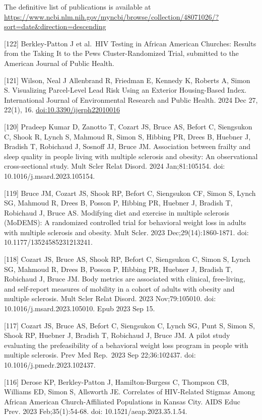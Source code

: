 \documentclass[
  12pt,
]{article}
\begin{document}
The definitive list of publications is available at
\url{https://www.ncbi.nlm.nih.gov/myncbi/browse/collection/48071026/?sort=date&direction=descending}

{[}122{]} Berkley-Patton J et al.~HIV Testing in African American
Churches: Results from the Taking It to the Pews Cluster-Randomized
Trial, submitted to the American Journal of Public Health.

{[}121{]} Wilson, Neal J Allenbrand R, Friedman E, Kennedy K, Roberts A,
Simon S. Visualizing Parcel-Level Lead Risk Using an Exterior
Housing-Based Index. International Journal of Environmental Research and
Public Health. 2024 Dec 27, 22(1), 16. \url{doi:10.3390/ijerph22010016}

{[}120{]} Pradeep Kumar D, Zanotto T, Cozart JS, Bruce AS, Befort C,
Siengsukon C, Shook R, Lynch S, Mahmoud R, Simon S, Hibbing PR, Drees B,
Huebner J, Bradish T, Robichaud J, Sosnoff JJ, Bruce JM. Association
between frailty and sleep quality in people living with multiple
sclerosis and obesity: An observational cross-sectional study. Mult
Scler Relat Disord. 2024 Jan;81:105154. doi:
10.1016/j.msard.2023.105154.

{[}119{]} Bruce JM, Cozart JS, Shook RP, Befort C, Siengsukon CF, Simon
S, Lynch SG, Mahmoud R, Drees B, Posson P, Hibbing PR, Huebner J,
Bradish T, Robichaud J, Bruce AS. Modifying diet and exercise in
multiple sclerosis (MoDEMS): A randomized controlled trial for
behavioral weight loss in adults with multiple sclerosis and obesity.
Mult Scler. 2023 Dec;29(14):1860-1871. doi: 10.1177/13524585231213241.

{[}118{]} Cozart JS, Bruce AS, Shook RP, Befort C, Siengsukon C, Simon
S, Lynch SG, Mahmoud R, Drees B, Posson P, Hibbing PR, Huebner J,
Bradish T, Robichaud J, Bruce JM. Body metrics are associated with
clinical, free-living, and self-report measures of mobility in a cohort
of adults with obesity and multiple sclerosis. Mult Scler Relat Disord.
2023 Nov;79:105010. doi: 10.1016/j.msard.2023.105010. Epub 2023 Sep 15.

{[}117{]} Cozart JS, Bruce AS, Befort C, Siengsukon C, Lynch SG, Punt S,
Simon S, Shook RP, Huebner J, Bradish T, Robichaud J, Bruce JM. A pilot
study evaluating the prefeasibility of a behavioral weight loss program
in people with multiple sclerosis. Prev Med Rep.~2023 Sep 22;36:102437.
doi: 10.1016/j.pmedr.2023.102437.

{[}116{]} Derose KP, Berkley-Patton J, Hamilton-Burgess C, Thompson CB,
Williams ED, Simon S, Allsworth JE. Correlates of HIV-Related Stigmas
Among African American Church-Affiliated Populations in Kansas City.
AIDS Educ Prev. 2023 Feb;35(1):54-68. doi: 10.1521/aeap.2023.35.1.54.
\end{document}
